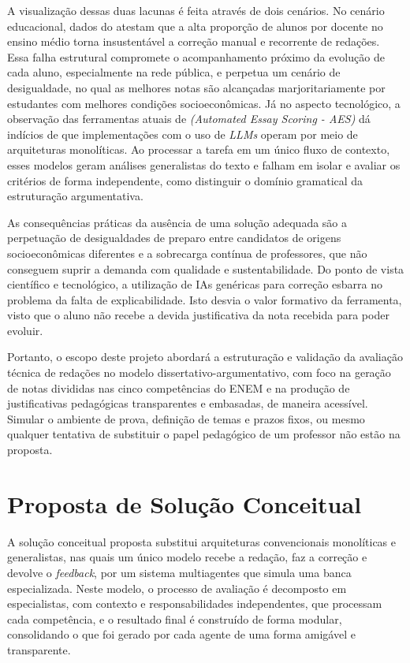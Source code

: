 \documentclass[12pt]{article}
\begin{document}
A visualização dessas duas lacunas é feita através de dois cenários. No cenário educacional, dados do  atestam que a alta proporção de alunos por docente no ensino médio torna insustentável a correção manual e recorrente de redações. Essa falha estrutural compromete o acompanhamento próximo da evolução de cada aluno, especialmente na rede pública, e perpetua um cenário de desigualdade, no qual as melhores notas são alcançadas marjoritariamente por estudantes com melhores condições socioeconômicas. Já no aspecto tecnológico, a observação das ferramentas atuais de \textit{(Automated Essay Scoring - AES)} dá indícios de que implementações com o uso de \textit{LLMs} operam por meio de arquiteturas monolíticas. Ao processar a tarefa em um único fluxo de contexto, esses modelos geram análises generalistas do texto e falham em isolar e avaliar os critérios de forma independente, como distinguir o domínio gramatical da estruturação argumentativa.

As consequências práticas da ausência de uma solução adequada são a perpetuação de desigualdades de preparo entre candidatos de origens socioeconômicas diferentes e a sobrecarga contínua de professores, que não conseguem suprir a demanda com qualidade e sustentabilidade. Do ponto de vista científico e tecnológico, a utilização de IAs genéricas para correção esbarra no problema da falta de explicabilidade. Isto desvia o valor formativo da ferramenta, visto que o aluno não recebe a devida justificativa da nota recebida para poder evoluir.

Portanto, o escopo deste projeto abordará a estruturação e validação da avaliação técnica de redações no modelo dissertativo-argumentativo, com foco na geração de notas divididas nas cinco competências do ENEM e na produção de justificativas pedagógicas transparentes e embasadas, de maneira acessível. Simular o ambiente de prova, definição de temas e prazos fixos, ou mesmo qualquer tentativa de substituir o papel pedagógico de um professor não estão na proposta.
\newpage

\section{Proposta de Solução Conceitual}
\label{sec:solucao}

A solução conceitual proposta substitui arquiteturas convencionais monolíticas e generalistas, nas quais um único modelo recebe a redação, faz a correção e devolve o \textit{feedback}, por um sistema multiagentes que simula uma banca especializada. Neste modelo, o processo de avaliação é decomposto em especialistas, com contexto e responsabilidades independentes, que processam cada competência, e o resultado final é construído de forma modular, consolidando o que foi gerado por cada agente de uma forma amigável e transparente.
\end{document}
